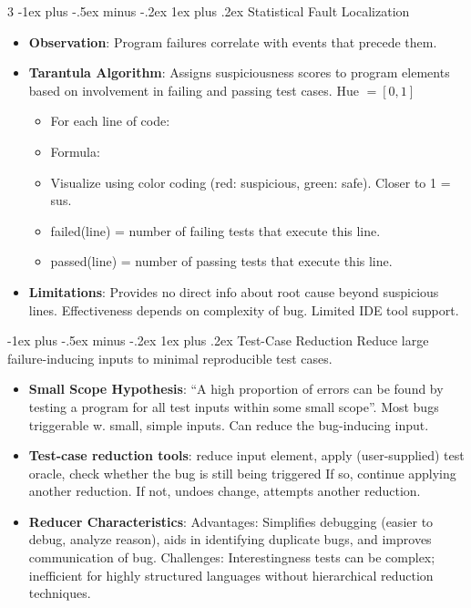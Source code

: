 \documentclass[a4paper, 10pt, landscape]{article}
\makeatletter
\renewcommand{\subsubsection}{\@startsection{subsubsection}{3}{0mm}%
                                {-1ex plus -.5ex minus -.2ex}%
                                {1ex plus .2ex}%
                                {\normalfont\small\bfseries}}
\makeatother
\begin{document}
\begin{multicols*}{3}
\subsubsection{Statistical Fault Localization}
\begin{itemize}
\item \textbf{Observation}: Program failures correlate with events that precede them. 
\item \textbf{Tarantula Algorithm}: Assigns suspiciousness scores to program elements based on involvement in failing and passing test cases. Hue $= [0,1]$
	\begin{itemize}[itemsep=-1pt]
	\item For each line of code:
	\item Formula:	\quad [\text{Suspiciousness}(line) = $\frac{  \frac{failed(line)}{total failed}  }{\frac{failed(line)}{total failed} + \frac{passed(line)}{total passed}}$	]
	\item Visualize using color coding (red: suspicious, green: safe). Closer to 1 = sus.
	\item failed(line) = number of failing tests that execute this line.
	\item passed(line) = number of passing tests that execute this line.
	\end{itemize}
\item \textbf{Limitations}: Provides no direct info about root cause beyond suspicious lines. Effectiveness depends on complexity of bug. Limited IDE tool support. 
\end{itemize}

\subsubsection{Test-Case Reduction}
Reduce large failure-inducing inputs to minimal reproducible test cases. 
\begin{itemize}[itemsep=-1pt]
\item \textbf{Small Scope Hypothesis}:  “A high proportion of errors can be found by testing a program for all test inputs within some small scope''. Most bugs triggerable w. small, simple inputs. Can reduce the bug-inducing input.
\item \textbf{Test-case reduction tools}: reduce input element, apply (user-supplied) test oracle, check whether the bug is still being triggered
 If so, continue applying another reduction. If not, undoes change, attempts another reduction. 
 \item \textbf{Reducer Characteristics}: Advantages: Simplifies debugging (easier to debug, analyze reason), aids in identifying duplicate bugs, and improves communication of bug. Challenges: Interestingness tests can be complex; inefficient for highly structured languages without hierarchical reduction techniques.
\end{itemize}
 

\end{multicols*}
\end{document}
